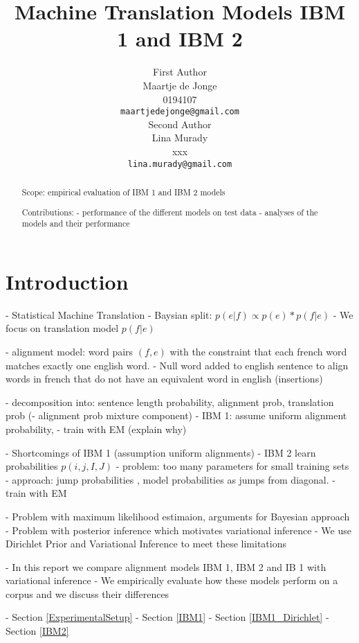 \documentclass[11pt,a4paper]{article}
\title{Machine Translation Models IBM 1 and IBM 2}
\author{First Author \\
  Maartje de Jonge \\
  0194107 \\
  {\tt maartjedejonge@gmail.com} \\\And
  Second Author \\
  Lina Murady \\
  xxx \\
  {\tt lina.murady@gmail.com} \\}
\date{}
\begin{document}
\maketitle

\begin{abstract}

Scope: empirical evaluation of IBM 1 and IBM 2 models 

Contributions: 
- performance of the different models on test data 
- analyses of the models and their performance

\end{abstract}

\section{Introduction}

- Statistical Machine Translation
- Baysian split: $p(e|f) \propto p(e)*p(f|e)$ 
- We focus on translation model $p(f|e)$

- alignment model: word pairs $(f,e)$ with the constraint that each french word 
matches exactly one english word. 
- Null word added to english sentence to align words in french that do
not have an equivalent word in english (insertions)

- decomposition into: sentence length probability, alignment prob,
translation prob
(- alignment prob mixture component)
- IBM 1: assume uniform alignment probability, 
- train with EM (explain why) 

- Shortcomings of IBM 1 (assumption uniform alignments)
- IBM 2 learn probabilities  $p(i,j,I,J)$
- problem: too many parameters for small training sets
- approach: jump probabilities \citep{Vogel}, 
model probabilities as jumps from diagonal.
- train with EM

- Problem with maximum likelihood estimaion, arguments for Bayesian approach
- Problem with posterior inference which motivates variational inference
- We use Dirichlet Prior and Variational Inference to meet these
limitations

- In this report we compare alignment models IBM 1, IBM 2
and IB 1 with variational inference
- We empirically evaluate how these models perform on a 
corpus and we discuss their differences


- Section \ref{ExperimentalSetup}
- Section \ref{IBM1}
- Section \ref{IBM1_Dirichlet}
- Section \ref{IBM2}
 
\end{document}
